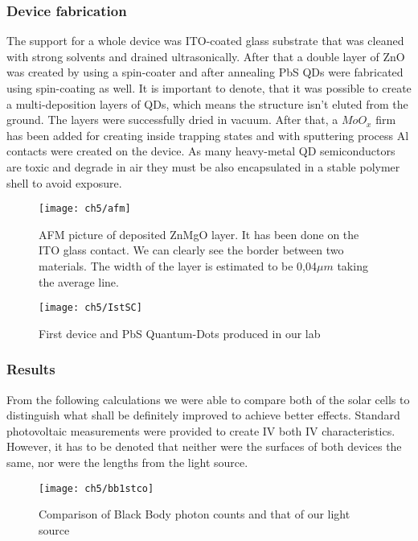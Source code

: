 \subsubsection{Device fabrication}
The support for a whole device was ITO-coated glass substrate that was cleaned with strong solvents and drained ultrasonically. After that a double layer of ZnO was created by using a spin-coater and after annealing PbS QDs were fabricated using spin-coating as well. It is important to denote, that it was possible to create a multi-deposition layers of QDs, which means the structure isn’t eluted from the ground. The layers were successfully dried in vacuum. After that, a $MoO_x$ firm has been added for creating inside trapping states and with sputtering process Al contacts were created on the device. As many heavy-metal QD semiconductors are toxic and degrade in air they must be also encapsulated in a stable polymer shell to avoid exposure. 

\begin{figure}[H]
\center
\texttt{[image: ch5/afm]}
\caption{AFM picture of deposited ZnMgO layer. It has been done on the ITO glass contact. We can clearly see the border between two materials. The width of the layer is estimated to be 0,04$\mu m$ taking the average line.}
\end{figure}

\begin{figure}
\center
\texttt{[image: ch5/IstSC]}
\caption{First device and PbS Quantum-Dots produced in our lab}
\end{figure}

\newpage
\subsubsection{Results}

From the following calculations we were able to compare both of the solar cells to distinguish what shall be definitely improved to achieve better effects. Standard photovoltaic measurements were provided to create IV both IV characteristics. However, it has to be denoted that neither were the surfaces of both devices the same, nor were the lengths from the light source. 

\begin{figure}[H]
\center
\texttt{[image: ch5/bb1stco]}
\caption{Comparison of Black Body photon counts and that of our light source}
\end{figure}

